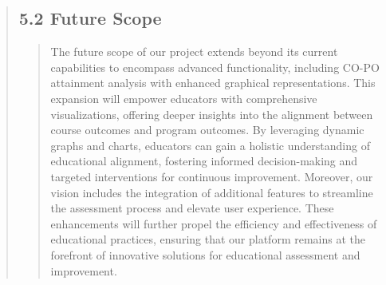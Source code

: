 \documentclass[12pt]{report}
\begin{document}
\begin{quote}
\begin{quote}
		\end{quote}
		\clearpage 
		
		\subsection{5.2 Future Scope}
		\begin{quote}
			The future scope of our project extends beyond its current capabilities to encompass advanced functionality, including CO-PO attainment analysis with enhanced graphical representations. This expansion will empower educators with comprehensive visualizations, offering deeper insights into the alignment between course outcomes and program outcomes. By leveraging dynamic graphs and charts, educators can gain a holistic understanding of educational alignment, fostering informed decision-making and targeted interventions for continuous improvement. Moreover, our vision includes the integration of additional features to streamline the assessment process and elevate user experience. These enhancements will further propel the efficiency and effectiveness of educational practices, ensuring that our platform remains at the forefront of innovative solutions for educational assessment and improvement.
		\end{quote}
		
	\end{quote}
	\clearpage
	
\end{document}
